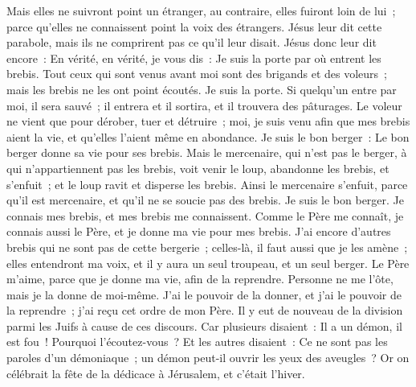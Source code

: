 \begin{multicols}{2}
Mais elles ne suivront point un étranger, au contraire, elles fuiront loin de lui~; parce qu'elles ne connaissent point la voix des étrangers.
Jésus leur dit cette parabole, mais ils ne comprirent pas ce qu'il leur disait.
Jésus donc leur dit encore~: En vérité, en vérité, je vous dis~: Je suis la porte par où entrent les brebis.
Tout ceux qui sont venus avant moi sont des brigands et des voleurs~; mais les brebis ne les ont point écoutés.
Je suis la porte. Si quelqu'un entre par moi, il sera sauvé~; il entrera et il sortira, et il trouvera des pâturages.
Le voleur ne vient que pour dérober, tuer et détruire~; moi, je suis venu afin que mes brebis aient la vie, et qu'elles l'aient même en abondance.
Je suis le bon berger~: Le bon berger donne sa vie pour ses brebis.
Mais le mercenaire, qui n'est pas le berger, à qui n'appartiennent pas les brebis, voit venir le loup, abandonne les brebis, et s'enfuit~; et le loup ravit et disperse les brebis.
Ainsi le mercenaire s'enfuit, parce qu'il est mercenaire, et qu'il ne se soucie pas des brebis. Je suis le bon berger.
Je connais mes brebis, et mes brebis me connaissent.
Comme le Père me connaît, je connais aussi le Père, et je donne ma vie pour mes brebis.
J'ai encore d'autres brebis qui ne sont pas de cette bergerie~; celles-là, il faut aussi que je les amène~; elles entendront ma voix, et il y aura un seul troupeau, et un seul berger.
Le Père m'aime, parce que je donne ma vie, afin de la reprendre.
Personne ne me l'ôte, mais je la donne de moi-même. J'ai le pouvoir de la donner, et j'ai le pouvoir de la reprendre~; j'ai reçu cet ordre de mon Père.
Il y eut de nouveau de la division parmi les Juifs à cause de ces discours.
Car plusieurs disaient~: Il a un démon, il est fou~! Pourquoi l'écoutez-vous~?
Et les autres disaient~: Ce ne sont pas les paroles d'un démoniaque~; un démon peut-il ouvrir les yeux des aveugles~?
Or on célébrait la fête de la dédicace à Jérusalem, et c'était l'hiver.

\end{multicols}
